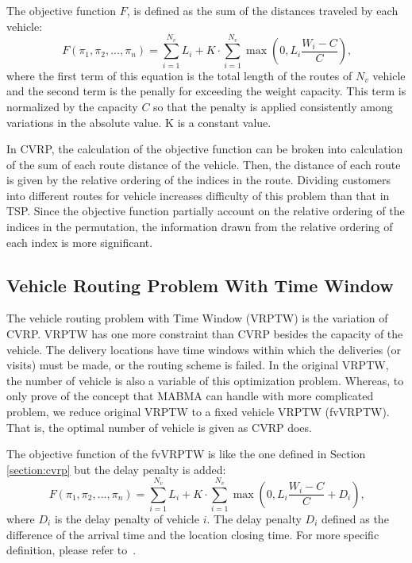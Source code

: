 The objective function $F$, is defined as the sum of the distances traveled by each vehicle:
\begin{equation*}
	F(\pi_1, \pi_2, ... , \pi_n) = \sum_{i=1}^{N_v}{L_i} + K\cdot\sum_{i=1}^{N_v}{ \max{(0,L_i\frac{W_i-C}{C})}} \text{,}
\end{equation*}
where the first term of this equation is the total length of the routes of $N_v$ vehicle  and the second term is the penally for exceeding the weight capacity. This term is normalized by the capacity $C$ so that the penalty is applied consistently among variations in the absolute value. K is a constant value.

In  CVRP, the calculation of the objective function can be broken into calculation of the sum of each route distance of the vehicle. Then, the distance of each route is given by the relative ordering of the indices in the route. Dividing customers into different routes for vehicle increases difficulty of this problem than that in TSP. Since the objective function partially account on the relative ordering of the indices in the permutation, the information drawn from the relative ordering of each index is more significant. 

\subsection*{Vehicle Routing Problem With Time Window}
The vehicle routing problem with Time Window (VRPTW)\citep{toth2001vehicle} is the variation of CVRP. VRPTW has one more constraint than CVRP besides the capacity of the vehicle. The delivery locations have time windows within which the deliveries (or visits) must be made, or the routing scheme is failed. In the original VRPTW, the number of vehicle is also a variable of this optimization problem. Whereas, to only prove of the concept that MABMA can handle with more complicated problem, we reduce original VRPTW to a fixed vehicle VRPTW (fvVRPTW). That is, the optimal number of vehicle is given as CVRP does. 

The objective function of the fvVRPTW is like the one defined in Section \ref{section:cvrp} but the delay penalty is added:
\begin{equation*}
	F(\pi_1, \pi_2, ... , \pi_n) = \sum_{i=1}^{N_v}{L_i} + K\cdot\sum_{i=1}^{N_v}{ \max{\left(0,L_i\frac{W_i-C}{C} + D_i\right)}} \text{,}
\end{equation*}
where $D_i$ is the delay penalty of vehicle $i$. The delay penalty $D_i$ defined as the difference of the arrival time and the location closing time. For more specific definition, please refer to~\citep{toth2001vehicle}.

